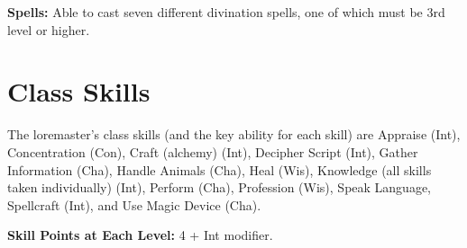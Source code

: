 \documentclass{article}
\begin{document}
\textbf{Spells:} Able to cast seven different divination spells, one of which must 
be 3rd level or higher.

\section*{\textbf{Class Skills}}

The loremaster's class skills (and the key ability for each skill) are Appraise 
(Int), Concentration (Con), Craft (alchemy) (Int), Decipher Script (Int), Gather 
Information (Cha), Handle Animals (Cha), Heal (Wis), Knowledge (all skills taken 
individually) (Int), Perform (Cha), Profession (Wis), Speak Language, Spellcraft 
(Int), and Use Magic Device (Cha). 

\textbf{Skill Points at Each Level:} 4 + Int modifier.
\end{document}
